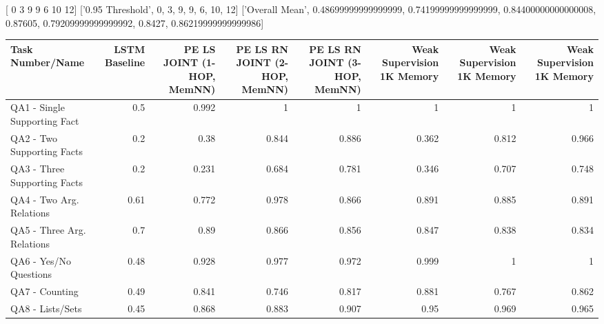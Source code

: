 [ 0  3  9  9  6 10 12]
['0.95 Threshold', 0, 3, 9, 9, 6, 10, 12]
['Overall Mean', 0.48699999999999999, 0.74199999999999999, 0.84400000000000008, 0.87605, 0.79209999999999992, 0.8427, 0.86219999999999986]
\begin{tabular}{lrrrrrrr}
\toprule
 Task Number/Name             &   LSTM Baseline &   PE LS JOINT (1-HOP, MemNN) &   PE LS RN JOINT (2-HOP, MemNN) &   PE LS RN JOINT (3-HOP, MemNN) &   Weak Supervision 1K Memory &   Weak Supervision 1K Memory &   Weak Supervision 1K Memory \\
\midrule
 QA1 - Single Supporting Fact &           0.5   &                        0.992 &                           1     &                         1       &                       1      &                       1      &                       1      \\
 QA2 - Two Supporting Facts   &           0.2   &                        0.38  &                           0.844 &                         0.886   &                       0.362  &                       0.812  &                       0.966  \\
 QA3 - Three Supporting Facts &           0.2   &                        0.231 &                           0.684 &                         0.781   &                       0.346  &                       0.707  &                       0.748  \\
 QA4 - Two Arg. Relations     &           0.61  &                        0.772 &                           0.978 &                         0.866   &                       0.891  &                       0.885  &                       0.891  \\
 QA5 - Three Arg. Relations   &           0.7   &                        0.89  &                           0.866 &                         0.856   &                       0.847  &                       0.838  &                       0.834  \\
 QA6 - Yes/No Questions       &           0.48  &                        0.928 &                           0.977 &                         0.972   &                       0.999  &                       1      &                       1      \\
 QA7 - Counting               &           0.49  &                        0.841 &                           0.746 &                         0.817   &                       0.881  &                       0.767  &                       0.862  \\
 QA8 - Lists/Sets             &           0.45  &                        0.868 &                           0.883 &                         0.907   &                       0.95   &                       0.969  &                       0.965  \\

\end{tabular}
